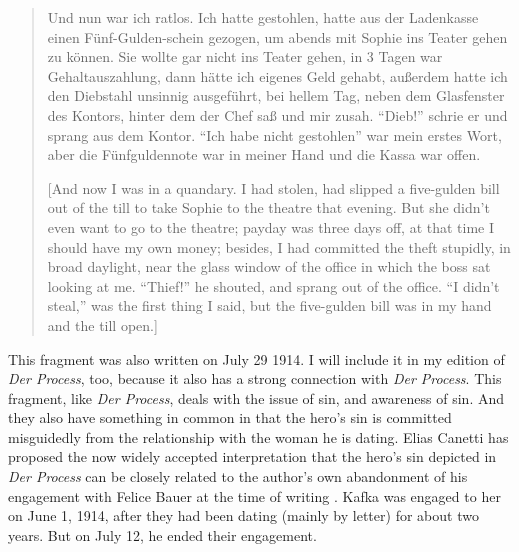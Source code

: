 \documentclass{article}
\begin{document}
\begin{quote}
Und nun war ich ratlos. Ich hatte gestohlen, hatte aus der Ladenkasse
einen Fünf-Gulden-schein gezogen, um abends mit Sophie ins Teater gehen
zu können. Sie wollte gar nicht ins Teater gehen, in 3 Tagen war
Gehaltauszahlung, dann hätte ich eigenes Geld gehabt, außerdem hatte ich
den Diebstahl unsinnig ausgeführt, bei hellem Tag, neben dem Glasfenster
des Kontors, hinter dem der Chef saß und mir zusah. ``Dieb!{}'' schrie er
und sprang aus dem Kontor. ``Ich habe nicht gestohlen'' war mein erstes
Wort, aber die Fünfguldennote war in meiner Hand und die Kassa war
offen. 

\begin{flushright}
    \parencite[668]{kafka_tagebucher_1990}
\end{flushright}

{[}And now I was in a quandary. I had stolen, had slipped a five-gulden
bill out of the till to take Sophie to the theatre that evening. But she
didn't even want to go to the theatre; payday was three days off, at
that time I should have my own money; besides, I had committed the theft
stupidly, in broad daylight, near the glass window of the office in
which the boss sat looking at me. ``Thief!'' he shouted, and sprang out of
the office. ``I didn't steal,'' was the first thing I said, but the
five-gulden bill was in my hand and the till open.{]} 

\begin{flushright}
    \parencite[298]{kafka_diaries_1975}
\end{flushright}

\end{quote}

This fragment was also written on July 29 1914. I will include it in my
edition of \emph{Der Process}, too, because it also has a strong
connection with \emph{Der Process}. This fragment, like \emph{Der
Process}, deals with the issue of sin, and awareness of sin. And they
also have something in common in that the hero's sin is committed
misguidedly from the relationship with the woman he is dating. Elias
Canetti has proposed the now widely accepted interpretation that the
hero's sin depicted in \emph{Der Process} can be closely related to the
author's own abandonment of his engagement with Felice Bauer at the time
of writing \citep[see][]{canetti_andere_1969}. Kafka was engaged to her on June 1, 1914,
after they had been dating (mainly by letter) for about two years. But
on July 12, he ended their engagement.
\end{document}

